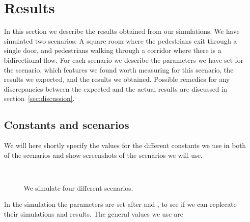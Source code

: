 \section{Results}
\label{sec:results}
In this section we describe the results obtained from our simulations. 
We have simulated two scenarios: A square room where the pedestrians 
exit through a single door, and pedestrians walking through a corridor 
where there is a bidirectional flow. For each scenario we describe the 
parameters we have set for the scenario, which features we found worth 
measuring for this scenario, the results we expected, and the results 
we obtained. Possible remedies for any discrepancies between the expected 
and the actual results are discussed in section~\ref{sec:discussion}.

\subsection{Constants and scenarios}
We will here shortly specify the values for the different constants 
we use in both of the scenarios and show screenshots of the scenarios 
we will use.

\begin{figure}[h]
\centering
{}
\\
\caption{We simulate four different scenarios.}
\label{fig:fourcases}
\end{figure}

In the simulation the parameters are set after \cite{ABconstant} and 
\cite{self-org}, to see if we can replecate their simulations and results. 
The general values we use are

